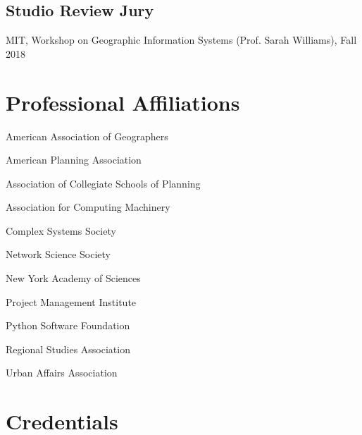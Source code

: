 \documentclass[12pt,letterpaper]{report}
\newcommand{\listitemspace}{0.15em}
\renewenvironment{itemize}
{\begin{list}{}{\setlength{\leftmargin}{0em}
            \setlength{\parskip}{0em}
            \setlength{\itemsep}{\listitemspace}
            \setlength{\parsep}{\listitemspace}}}
    {\end{list}}
\begin{document}
    \subsection*{Studio Review Jury}
    
    \begin{itemize}
        
        \item MIT, Workshop on Geographic Information Systems (Prof. Sarah Williams), Fall 2018
    
    \end{itemize}


    \section*{Professional Affiliations}

    \begin{itemize}

        \item American Association of Geographers

        \item American Planning Association

        \item Association of Collegiate Schools of Planning

        \item Association for Computing Machinery

        \item Complex Systems Society
        
        \item Network Science Society

        \item New York Academy of Sciences

        \item Project Management Institute

        \item Python Software Foundation
        
        \item Regional Studies Association

        \item Urban Affairs Association

    \end{itemize}



    \section*{Credentials}
\end{document}
